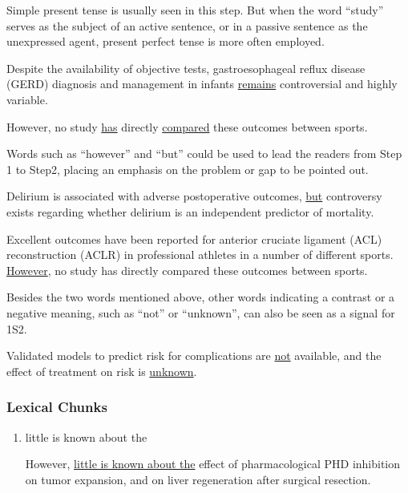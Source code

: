 \documentclass{ctexbook}
\begin{document}
    Simple present tense is usually seen in this step. But when the word ``study'' serves as the subject of an active sentence, or in a passive sentence as the unexpressed agent, present perfect tense is more often employed.

    \begin{eg}{}
      Despite the availability of objective tests, gastroesophageal reflux disease (GERD) diagnosis and management in infants \uline{remains} controversial and highly variable.
    \end{eg}

    \begin{eg}{}
      However, no study \uline{has} directly \uline{compared} these outcomes between sports.
    \end{eg}

    Words such as ``however'' and ``but'' could be used to lead the readers from Step 1 to Step2, placing an emphasis on the problem or gap to be pointed out.

    \begin{eg}{}
      Delirium is associated with adverse postoperative outcomes, \uline{but} controversy exists regarding whether delirium is an independent predictor of mortality.
    \end{eg}

    \begin{eg}{}
      Excellent outcomes have been reported for anterior cruciate ligament (ACL) reconstruction (ACLR) in professional athletes in a number of different sports. \uline{However}, no study has directly compared these outcomes between sports.
    \end{eg}

    Besides the two words mentioned above, other words indicating a contrast or a negative meaning, such as ``not'' or ``unknown'', can also be seen as a signal for 1S2.

    \begin{eg}{}
      Validated models to predict risk for complications are \uline{not} available, and the effect of treatment on risk is \uline{unknown}.
    \end{eg}

    \subsubsection{Lexical Chunks}

    \begin{enumerate}
      \item little is known about the
      \begin{eg}{}
        However, \uline{little is known about the} effect of pharmacological PHD inhibition on tumor expansion, and on liver regeneration after surgical resection.
      \end{eg}
    \end{enumerate}
\end{document}
